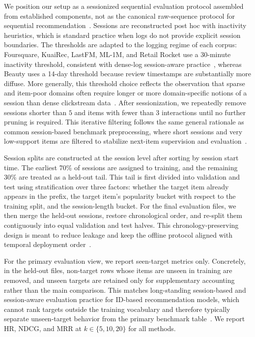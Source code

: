 \documentclass[sigconf,review,anonymous]{acmart}
\begin{document}
We position our setup as a sessionized sequential evaluation protocol assembled from established components, not as the canonical raw-sequence protocol for sequential recommendation~\cite{jannach2022sessions,quadrana2017hrnn,latifi2021sessionaware}. Sessions are reconstructed post hoc with inactivity heuristics, which is standard practice when logs do not provide explicit session boundaries. The thresholds are adapted to the logging regime of each corpus: Foursquare, KuaiRec, LastFM, ML-1M, and Retail Rocket use a 30-minute inactivity threshold, consistent with dense-log session-aware practice~\cite{quadrana2017hrnn,lacic2020jobsessions}, whereas Beauty uses a 14-day threshold because review timestamps are substantially more diffuse. More generally, this threshold choice reflects the observation that sparse and item-poor domains often require longer or more domain-specific notions of a session than dense clickstream data~\cite{borgbruun2022insurance}. After sessionization, we repeatedly remove sessions shorter than $5$ and items with fewer than $3$ interactions until no further pruning is required. This iterative filtering follows the same general rationale as common session-based benchmark preprocessing, where short sessions and very low-support items are filtered to stabilize next-item supervision and evaluation~\cite{li2017narm,wu2019srgnn}.

Session splits are constructed at the session level after sorting by session start time. The earliest 70\% of sessions are assigned to training, and the remaining 30\% are treated as a held-out tail. This tail is first divided into validation and test using stratification over three factors: whether the target item already appears in the prefix, the target item's popularity bucket with respect to the training split, and the session-length bucket. For the final evaluation files, we then merge the held-out sessions, restore chronological order, and re-split them contiguously into equal validation and test halves. This chronology-preserving design is meant to reduce leakage and keep the offline protocol aligned with temporal deployment order~\cite{ji2023leakage,gusak2025timesplit}.

For the primary evaluation view, we report seen-target metrics only. Concretely, in the held-out files, non-target rows whose items are unseen in training are removed, and unseen targets are retained only for supplementary accounting rather than the main comparison. This matches long-standing session-based and session-aware evaluation practice for ID-based recommendation models, which cannot rank targets outside the training vocabulary and therefore typically separate unseen-target behavior from the primary benchmark table~\cite{latifi2021sessionaware}. We report HR, NDCG, and MRR at $k\in\{5,10,20\}$ for all methods.
\end{document}
